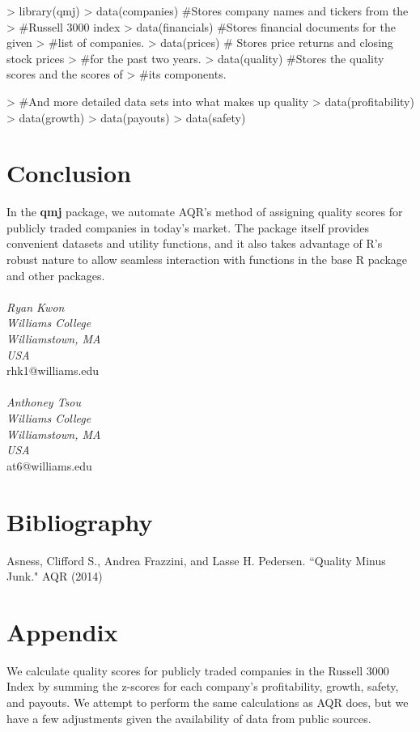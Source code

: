 \documentclass[titlepage]{article}
\begin{document}
\begin{Schunk}
\begin{Sinput}
> library(qmj)
> data(companies) #Stores company names and tickers from the 
> #Russell 3000 index
> data(financials) #Stores financial documents for the given 
> #list of companies.
> data(prices) # Stores price returns and closing stock prices 
> #for the past two years.
> data(quality) #Stores the quality scores and the scores of 
> #its components.
\end{Sinput}
\end{Schunk}
\begin{Schunk}
\begin{Sinput}
> #And more detailed data sets into what makes up quality
> data(profitability)
> data(growth)
> data(payouts)
> data(safety)
\end{Sinput}
\end{Schunk}

\section*{Conclusion}

In the \textbf{qmj} package, we automate AQR's method of assigning quality scores for publicly traded companies in today's market. The package itself provides convenient datasets and utility functions, and it also takes advantage of R's robust nature to allow seamless interaction with functions in the base R package and other packages.
\\
\\
\emph{Ryan Kwon}
\\
\emph{Williams College}
\\
\emph{Williamstown, MA}
\\
\emph{USA}
\\
rhk1@williams.edu
\\
\\
\emph{Anthoney Tsou}
\\
\emph{Williams College}
\\
\emph{Williamstown, MA}
\\
\emph{USA}
\\
at6@williams.edu

\section*{Bibliography}
Asness, Clifford S., Andrea Frazzini, and Lasse H. Pedersen. ``Quality Minus Junk." AQR (2014)
\section*{Appendix}
We calculate quality scores for publicly traded companies in the Russell 3000 Index by summing the z-scores for each company's profitability, growth, safety, and payouts. We attempt to perform the same calculations as AQR does, but we have a few adjustments given the availability of data from public sources. 
\end{document}
